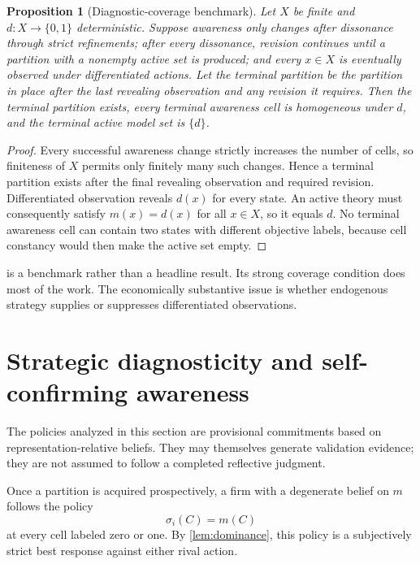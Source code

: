 \documentclass[11pt]{article}
\newtheorem{proposition}[assumption]{Proposition}
\begin{document}
\begin{proposition}[Diagnostic-coverage benchmark]
\label{prop:coverage}
Let $X$ be finite and $d:X\to\{0,1\}$ deterministic.  Suppose awareness only
changes after dissonance through strict refinements; after every dissonance,
revision continues until a partition with a nonempty active set is produced;
and every $x\in X$ is eventually observed under differentiated actions.  Let
the terminal partition be the partition in place after the last revealing
observation and any revision it requires.  Then the terminal partition exists,
every terminal awareness cell is homogeneous under $d$, and the terminal active
model set is $\{d\}$.
\end{proposition}

\begin{proof}
Every successful awareness change strictly increases the number of cells, so
finiteness of $X$ permits only finitely many such changes.  Hence a terminal
partition exists after the final revealing observation and required revision.
Differentiated observation reveals $d(x)$ for every state.  An active theory
must consequently satisfy $m(x)=d(x)$ for all $x\in X$, so it equals $d$.
No terminal awareness cell can contain two states with different objective
labels, because cell constancy would then make the active set empty.
\end{proof}

 is a benchmark rather than a headline result.  Its strong
coverage condition does most of the work.  The economically substantive issue
is whether endogenous strategy supplies or suppresses differentiated
observations.

\section{Strategic diagnosticity and self-confirming awareness}

The policies analyzed in this section are provisional commitments based on
representation-relative beliefs.  They may themselves generate validation
evidence; they are not assumed to follow a completed reflective judgment.

Once a partition is acquired prospectively, a firm with a degenerate belief on
$m$ follows the policy
\[
\sigma_i(C)=m(C)
\]
at every cell labeled zero or one.  By \cref{lem:dominance}, this policy is a
subjectively strict best response against either rival action.
\end{document}
